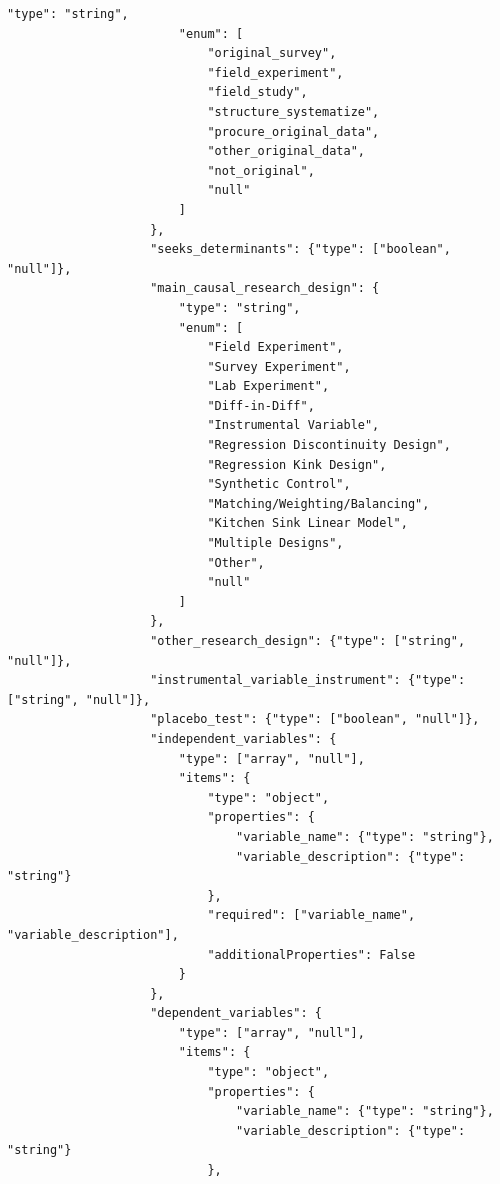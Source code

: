 \documentclass[12pt]{article}
\begin{document}
{\begin{Verbatim}[breaklines=true]
                        "type": "string", 
                        "enum": [
                            "original_survey",
                            "field_experiment",
                            "field_study",
                            "structure_systematize",
                            "procure_original_data",
                            "other_original_data",
                            "not_original",
                            "null"
                        ]
                    },
                    "seeks_determinants": {"type": ["boolean", "null"]},
                    "main_causal_research_design": {
                        "type": "string", 
                        "enum": [
                            "Field Experiment",
                            "Survey Experiment", 
                            "Lab Experiment",
                            "Diff-in-Diff", 
                            "Instrumental Variable", 
                            "Regression Discontinuity Design",
                            "Regression Kink Design",
                            "Synthetic Control",
                            "Matching/Weighting/Balancing",
                            "Kitchen Sink Linear Model",
                            "Multiple Designs",
                            "Other",
                            "null"
                        ]
                    },
                    "other_research_design": {"type": ["string", "null"]},
                    "instrumental_variable_instrument": {"type": ["string", "null"]},
                    "placebo_test": {"type": ["boolean", "null"]},
                    "independent_variables": {
                        "type": ["array", "null"],
                        "items": {
                            "type": "object",
                            "properties": {
                                "variable_name": {"type": "string"},
                                "variable_description": {"type": "string"}
                            },
                            "required": ["variable_name", "variable_description"],
                            "additionalProperties": False
                        }
                    },
                    "dependent_variables": {
                        "type": ["array", "null"],
                        "items": {
                            "type": "object",
                            "properties": {
                                "variable_name": {"type": "string"},
                                "variable_description": {"type": "string"}
                            },

\end{Verbatim}}
\end{document}
